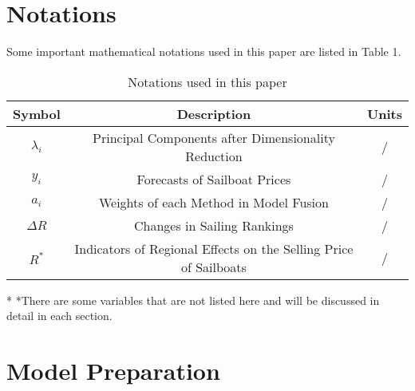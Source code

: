 \section{Notations}
Some important mathematical notations used in this paper are listed in Table 1. 
\begin{table}[htbp]
\begin{center}
\caption{Notations used in this paper}
\begin{tabular}{c c c}
\toprule[2pt]
\multicolumn{1}{m{1.5cm}}{\centering Symbol}
&\multicolumn{1}{m{12.5cm}}{\centering Description }
&\multicolumn{1}{m{1cm}}{\centering Units}\\
\midrule
$\lambda_i$& Principal Components after Dimensionality Reduction&/ \\
$y_i$& Forecasts of Sailboat Prices&/\\
$a_i$& Weights of each Method in Model Fusion&/\\
$\Delta R$&Changes in Sailing Rankings&/ \\
$R^*$ & Indicators of Regional Effects on the Selling Price of Sailboats &/\\
\bottomrule[2pt]
\end{tabular}\label{tb:notation}

 \begin{tablenotes}
        \footnotesize
        \item[*] *There are some variables that are not listed here and will be discussed in detail in each section. %
      \end{tablenotes}
\end{center}
\end{table}
\vspace{-1.2cm}%

\section{Model Preparation}
